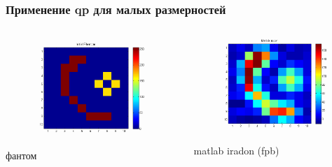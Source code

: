 \documentclass[12pt]{beamer}
\begin{document}
\begin{frame}
\frametitle{Применение qp для малых размерностей}
\begin{columns}[T,onlytextwidth]
  \hspace*{-1cm}
\begin{column}{0.4\textwidth}
  \begin{figure}
    \centering
    \includegraphics[width=\textwidth]{qp_phantom}
  \end{figure}
  фантом
\end{column}

\begin{column}{0.4\textwidth}
  \begin{figure}
    \centering
    \includegraphics[width=\textwidth]{qp_fbp}
  \end{figure}
  matlab iradon (fpb)
\end{column}


\end{columns}
\end{frame}
\end{document}
